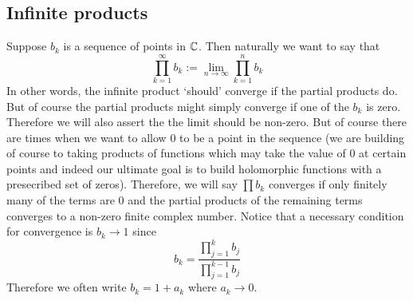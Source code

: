 \subsection{Infinite products}
Suppose $b_k$ is a sequence of points in $\mathbb{C}$. Then naturally we want to say that 
$$\prod_{k = 1}^\infty b_k := \lim_{n \to \infty} \prod_{k = 1}^n b_k$$
In other words, the infinite product `should' converge if the partial products do. But of course the partial products might simply converge if one of the $b_k$ is zero. Therefore we will also assert the the limit should be non-zero. But of course there are times when we want to allow 0 to be a point in the sequence (we are building of course to taking products of functions which may take the value of 0 at certain points and indeed our ultimate goal is to build holomorphic functions with a presecribed set of zeros). Therefore, we will say $\prod b_k$ converges if only finitely many of the terms are 0 and the partial products of the remaining terms converges to a non-zero finite complex number. Notice that a necessary condition for convergence is $b_k \to 1$ since
$$b_k = \frac{\prod_{j = 1}^k b_j}{\prod_{j = 1}^{k - 1} b_j}$$
Therefore we often write $b_k = 1 + a_k$ where $a_k \to 0$. 
